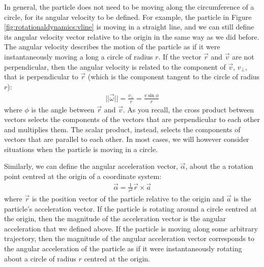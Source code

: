 In general, the particle does not need to be moving along the circumference of a circle, for its angular velocity to be defined. For example, the particle in Figure \ref{fig:rotationaldynamics:vline} is moving in a straight line, and we can still define its angular velocity vector relative to the origin in the same way as we did before. 
The angular velocity describes the motion of the particle as if it were instantaneously moving a long a circle of radius $r$. If the vector $\vec r$ and $\vec v$ are not perpendicular, then the angular velocity is related to the component of $\vec v$, $v_\perp$, that is perpendicular to $\vec r$ (which is the component tangent to the circle of radius $r$):
\begin{align*}
||\vec \omega|| = \frac{v_\perp}{r}=\frac{v\sin\phi}{r}
\end{align*}
where $\phi$ is the angle between $\vec r$ and $\vec v$. As you recall, the cross product between vectors selects the components of the vectors that are perpendicular to each other and multiplies them. The scalar product, instead, selects the components of vectors that are parallel to each other. In most cases, we will however consider situations when the particle is moving in a circle.

Similarly, we can define the angular acceleration vector, $\vec \alpha$, about the a rotation point centred at the origin of a coordinate system:
\begin{align}
\vec \alpha = \frac{1}{r^2}\vec r \times \vec a
\end{align}
where $\vec r$ is the position vector of the particle relative to the origin and $\vec a$ is the particle's acceleration vector. If the particle is rotating around a circle centred at the origin, then the magnitude of the acceleration vector is the angular acceleration that we defined above. If the particle is moving along some arbitrary trajectory, then the magnitude of the angular acceleration vector corresponds to the angular acceleration of the particle as if it were instantaneously rotating about a circle of radius $r$ centred at the origin. 

